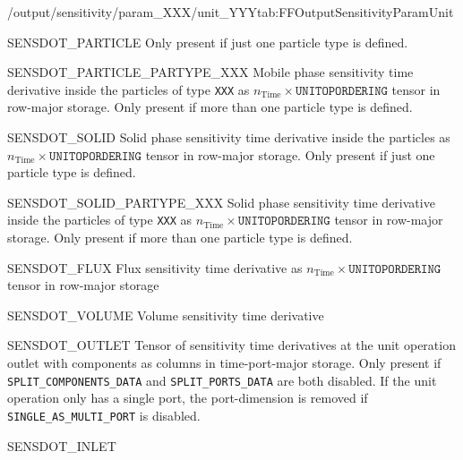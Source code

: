 \begin{groupscope}{/output/sensitivity/param\_XXX/unit\_YYY}{tab:FFOutputSensitivityParamUnit}
\begin{dataset}[type=double,unit={\si{\mol\per\cubic\metre\of{MP}\per\second\per\ParamUnit}}]{SENSDOT\_PARTICLE}
    Only present if just one particle type is defined.
  \end{dataset}
  \begin{dataset}[type=double,unit={\si{\mol\per\cubic\metre\of{MP}\per\second\per\ParamUnit}}]{SENSDOT\_PARTICLE\_PARTYPE\_XXX}
    Mobile phase sensitivity time derivative inside the particles of type \texttt{XXX} as $n_{\text{Time}} \times \texttt{UNITOPORDERING}$ tensor in row-major storage.
    Only present if more than one particle type is defined.
  \end{dataset}
  \begin{dataset}[type=double,unit={\si{\mol\per\cubic\metre\of{MP}\per\second\per\ParamUnit}}]{SENSDOT\_SOLID}
    Solid phase sensitivity time derivative inside the particles as $n_{\text{Time}} \times \texttt{UNITOPORDERING}$ tensor in row-major storage.
    Only present if just one particle type is defined.
  \end{dataset}
  \begin{dataset}[type=double,unit={\si{\mol\per\cubic\metre\of{SP}\per\second\per\ParamUnit}}]{SENSDOT\_SOLID\_PARTYPE\_XXX}
    Solid phase sensitivity time derivative inside the particles of type \texttt{XXX} as $n_{\text{Time}} \times \texttt{UNITOPORDERING}$ tensor in row-major storage.
    Only present if more than one particle type is defined.
  \end{dataset}
  \begin{dataset}[type=double,unit={\si{\mol\per\square\metre\per\square\second\per\ParamUnit}}]{SENSDOT\_FLUX}
    Flux sensitivity time derivative as $n_{\text{Time}} \times \texttt{UNITOPORDERING}$ tensor in row-major storage
  \end{dataset}
  \begin{dataset}[type=double,unit={\si{\cubic\per\second\metre\per\ParamUnit}}]{SENSDOT\_VOLUME}
    Volume sensitivity time derivative 
  \end{dataset}
  \begin{dataset}[type=double,unit={\si{\mol\per\cubic\metre\of{IV}\per\second\per\ParamUnit}}]{SENSDOT\_OUTLET}
    Tensor of sensitivity time derivatives at the unit operation outlet with components as columns in time-port-major storage.
    Only present if \texttt{SPLIT\_COMPONENTS\_DATA} and \texttt{SPLIT\_PORTS\_DATA} are both disabled.
    If the unit operation only has a single port, the port-dimension is removed if \texttt{SINGLE\_AS\_MULTI\_PORT} is disabled.
  \end{dataset}
  \begin{dataset}[type=double,unit={\si{\mol\per\cubic\metre\of{IV}\per\second\per\ParamUnit}}]{SENSDOT\_INLET}

\end{dataset}
\end{groupscope}
